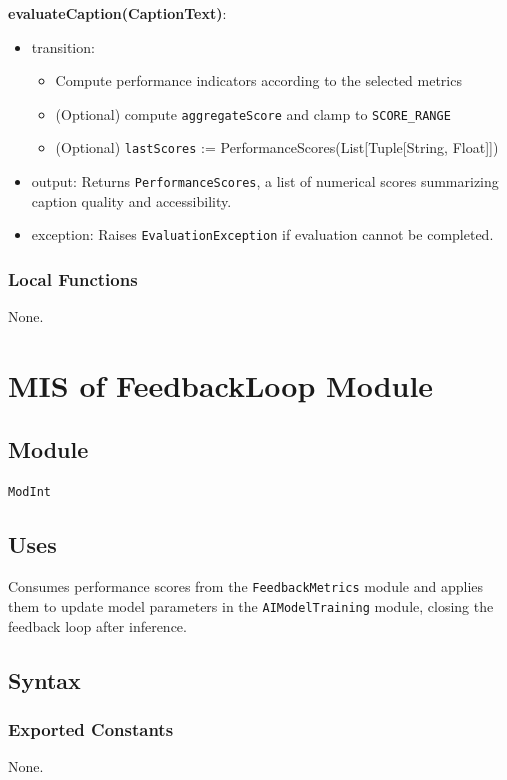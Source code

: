 \documentclass[12pt, titlepage]{article}
\begin{document}
\noindent \textbf{evaluateCaption(CaptionText)}:
\begin{itemize}
  \item transition:
  \begin{itemize}
    \item Compute performance indicators according to the selected metrics
    \item (Optional) compute \texttt{aggregateScore} and clamp to \texttt{SCORE\_RANGE}
    \item (Optional) \texttt{lastScores} := PerformanceScores(List[Tuple[String, Float]])
  \end{itemize}
  \item output: Returns \texttt{PerformanceScores}, a list of numerical scores summarizing caption quality and accessibility.
  \item exception: Raises \texttt{EvaluationException} if evaluation cannot be completed.
\end{itemize}

\subsubsection{Local Functions}
None.

\section{MIS of FeedbackLoop Module} \label{modint}

\subsection{Module}
\texttt{ModInt}

\subsection{Uses}
Consumes performance scores from the \texttt{FeedbackMetrics} module and applies them to update model parameters 
in the \texttt{AIModelTraining} module, closing the feedback loop after inference.

\subsection{Syntax}

\subsubsection{Exported Constants}
None.
\end{document}
